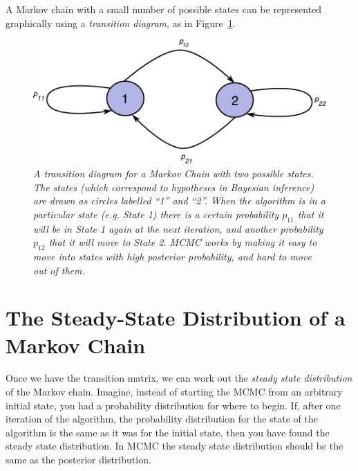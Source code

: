 A Markov chain with a small number of possible states can be represented
graphically using a {\it transition diagram}, as in
Figure~\ref{fig:transitions}.

\begin{figure}[ht!]
\begin{center}
\includegraphics[scale=0.65]{Figures/transitions.pdf}
\caption{\it A transition diagram for a Markov Chain with two possible states.
The states (which correspond to hypotheses in Bayesian inference) are drawn
as circles labelled ``1'' and ``2''. When the algorithm is in a particular state
(e.g. State 1) there is a certain probability $p_{11}$ that it will be in State
1 again at the next iteration, and another probability $p_{12}$ that it will
move to State 2. MCMC works by making it easy to move into states with high
posterior probability, and hard to move out of them.
\label{fig:transitions}}
\end{center}
\end{figure}

\section{The Steady-State Distribution of a Markov Chain}
Once we have the transition matrix, we can work out the {\it steady state
distribution} of the Markov chain. Imagine, instead of starting the MCMC
from an arbitrary initial state, you had a probability distribution for where
to begin. If, after one iteration of the algorithm, the probability distribution
for the state of the algorithm is the same as it was for the initial state,
then you have found the steady state distribution. In MCMC the steady state
distribution should be the same as the posterior distribution.

